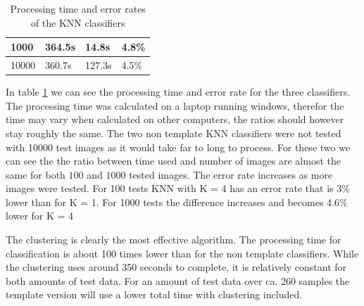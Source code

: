 \documentclass{article}
\begin{document}
\begin{table}[]
\begin{tabular}{lllll}
\multicolumn{1}{|l|}{1000}                               & \multicolumn{2}{l|}{364.5s}                                      & \multicolumn{1}{l|}{14.8s}     & \multicolumn{1}{l|}{4.8\%}      \\ \hline
\multicolumn{1}{|l|}{10000}                              & \multicolumn{2}{l|}{360.7s}                                      & \multicolumn{1}{l|}{127.3s}    & \multicolumn{1}{l|}{4.5\%}      \\ \hline
\end{tabular}
\caption{Processing time and error rates of the KNN classifiers}
\label{tbl:time}
\end{table}

In table \ref{tbl:time} we can see the processing time and error rate for the three classifiers. The processing time was calculated on a laptop running windows, therefor the time may vary when calculated on other computers, the ratios should however stay roughly the same. The two non template KNN classifiers were not tested with 10000 test images as it would take far to long to process. For these two we can see the the ratio between time used and number of images are almost the same for both $100$ and $1000$ tested images. The error rate increases as more images were tested. For 100 tests KNN with K = 4 has an error rate that is $3\%$ lower than for K = 1. For 1000 tests the difference increases and becomes 4.6\% lower for K = 4

The clustering is clearly the most effective algorithm. The processing time for classification is about 100 times lower than for the non template classifiers. While the clustering uses around 350 seconds to complete, it is relatively constant for both amounts of test data. For an amount of test data over ca. 260 samples the template version will use a lower total time with clustering included.
\end{document}
